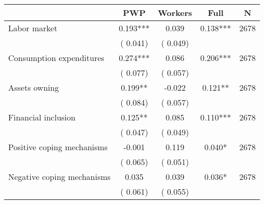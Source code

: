 
\begin{tabular}{l*{4}{c}}\hline&\multicolumn{1}{c}{PWP}&\multicolumn{1}{c}{Workers}&\multicolumn{1}{c}{Full}&\multicolumn{1}{c}{N} \\ \hline

 Labor market &              0.193*** &         0.039 &           0.138*** & 2678                       \\  
                 &        (       0.041)                   &        (       0.049)                        &                                                             &                                                      \\      

 Consumption expenditures &              0.274*** &         0.086 &           0.206*** & 2678                       \\  
                 &        (       0.077)                   &        (       0.057)                        &                                                             &                                                      \\      

 Assets owning &              0.199** &        -0.022 &           0.121** & 2678                       \\  
                 &        (       0.084)                   &        (       0.057)                        &                                                             &                                                      \\      

 Financial inclusion &              0.125** &         0.085 &           0.110*** & 2678                       \\  
                 &        (       0.047)                   &        (       0.049)                        &                                                             &                                                      \\      

 Positive coping mechanisms &             -0.001 &         0.119 &           0.040* & 2678                       \\  
                 &        (       0.065)                   &        (       0.051)                        &                                                             &                                                      \\      

 Negative coping mechanisms &              0.035 &         0.039 &           0.036* & 2678                       \\  
                 &        (       0.061)                   &        (       0.055)                        &                                                             &                                                      \\      


\end{tabular}
